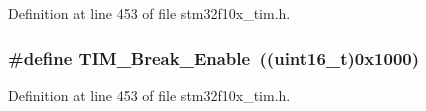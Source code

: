Definition at line 453 of file stm32f10x\+\_\+tim.\+h.

\subsubsection[{\texorpdfstring{T\+I\+M\+\_\+\+Break\+\_\+\+Enable}{TIM_Break_Enable}}]{\setlength{\rightskip}{0pt plus 5cm}\#define T\+I\+M\+\_\+\+Break\+\_\+\+Enable~(({\bf uint16\+\_\+t})0x1000)}\hypertarget{group___break___input__enable__disable_gae7fbc11ac043454b2a880bffe98fdb8c}{}\label{group___break___input__enable__disable_gae7fbc11ac043454b2a880bffe98fdb8c}


Definition at line 453 of file stm32f10x\+\_\+tim.\+h.

